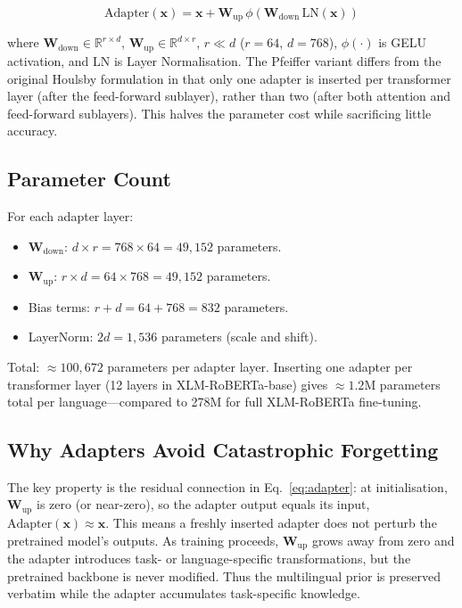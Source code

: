 \documentclass[12pt,a4paper,oneside]{report}
\newcommand{\xlmr}{XLM-RoBERTa}
\begin{document}
\begin{equation}
  \text{Adapter}(\mathbf{x}) = \mathbf{x} + \mathbf{W}_\text{up}\,\phi(\mathbf{W}_\text{down}\,\text{LN}(\mathbf{x}))
  \label{eq:adapter}
\end{equation}

where $\mathbf{W}_\text{down} \in \mathbb{R}^{r \times d}$,
$\mathbf{W}_\text{up} \in \mathbb{R}^{d \times r}$, $r \ll d$ ($r=64$, $d=768$),
$\phi(\cdot)$ is GELU activation, and LN is Layer Normalisation. The Pfeiffer
variant differs from the original Houlsby formulation in that only one adapter
is inserted per transformer layer (after the feed-forward sublayer), rather
than two (after both attention and feed-forward sublayers). This halves the
parameter cost while sacrificing little accuracy.

\subsection{Parameter Count}

For each adapter layer:
\begin{itemize}
  \item $\mathbf{W}_\text{down}$: $d \times r = 768 \times 64 = 49{,}152$ parameters.
  \item $\mathbf{W}_\text{up}$: $r \times d = 64 \times 768 = 49{,}152$ parameters.
  \item Bias terms: $r + d = 64 + 768 = 832$ parameters.
  \item LayerNorm: $2d = 1{,}536$ parameters (scale and shift).
\end{itemize}
Total: ${\approx}100{,}672$ parameters per adapter layer. Inserting one adapter
per transformer layer (12 layers in \xlmr{}-base) gives ${\approx}1.2$M
parameters total per language---compared to 278M for full \xlmr{} fine-tuning.

\subsection{Why Adapters Avoid Catastrophic Forgetting}

The key property is the residual connection in Eq.~\ref{eq:adapter}: at
initialisation, $\mathbf{W}_\text{up}$ is zero (or near-zero), so the adapter
output equals its input, $\text{Adapter}(\mathbf{x}) \approx \mathbf{x}$. This
means a freshly inserted adapter does not perturb the pretrained model's
outputs. As training proceeds, $\mathbf{W}_\text{up}$ grows away from zero and
the adapter introduces task- or language-specific transformations, but the
pretrained backbone is never modified. Thus the multilingual prior is
preserved verbatim while the adapter accumulates task-specific knowledge.
\end{document}
